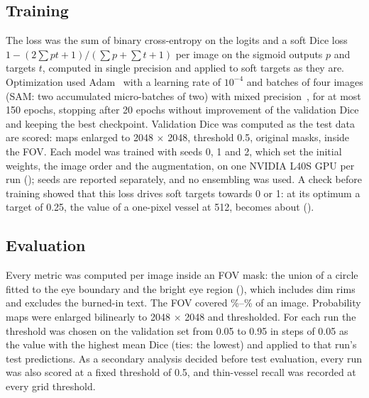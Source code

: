 \subsection*{Training}
The loss was the sum of binary cross-entropy on the logits and a soft Dice loss $1 - (2\sum p t + 1)/(\sum p + \sum t + 1)$
per image on the sigmoid outputs $p$ and targets $t$, computed in single precision and applied to soft targets as they
are. Optimization used Adam~\cite{kingma2015adam} with a learning rate of $10^{-4}$ and batches of four images (SAM: two
accumulated micro-batches of two) with mixed precision~\cite{micikevicius2018mixed}, for at most 150 epochs, stopping after
20 epochs without improvement of the validation Dice and keeping the best checkpoint. Validation Dice was computed as the
test data are scored: maps enlarged to 2048 $\times$ 2048, threshold 0.5, original masks, inside the FOV. Each model was
trained with seeds 0, 1 and 2, which set the initial weights, the image order and the augmentation, on one NVIDIA L40S
GPU per run (); seeds are reported separately, and no ensembling was used. A check before training
showed that this loss drives soft targets towards 0 or 1: at its optimum a target of 0.25, the value of a one-pixel vessel at 512, becomes about \LossOptQuarter{} ().

\subsection*{Evaluation}
Every metric was computed per image inside an FOV mask: the union of a circle fitted to the eye boundary and the bright eye
region (), which includes dim rims and excludes the burned-in text. The FOV covered
\FOVShareMin\%--\FOVShareMax\% of an image. Probability maps were enlarged bilinearly to
2048 $\times$ 2048 and thresholded. For each run the threshold was chosen on the validation set from 0.05 to 0.95 in steps of
0.05 as the value with the highest mean Dice (ties: the lowest) and applied to that run's test predictions. As a secondary
analysis decided before test evaluation, every run was also scored at a fixed threshold of 0.5, and thin-vessel recall was
recorded at every grid threshold.

